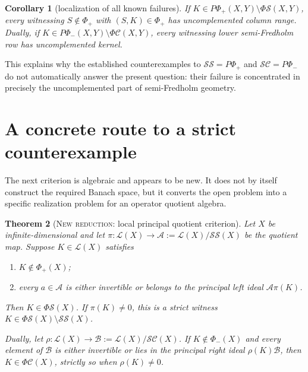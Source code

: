\documentclass[11pt]{article}
\newtheorem{theorem}{Theorem}[section]
\newtheorem{corollary}[theorem]{Corollary}
\theoremstyle{definition}
\newcommand{\Lop}{\mathcal L}
\newcommand{\SSing}{\mathcal{SS}}
\newcommand{\SCos}{\mathcal{SC}}
\newcommand{\PhiS}{\Phi\mathcal S}
\newcommand{\PhiC}{\Phi\mathcal C}
\newcommand{\PhiP}{\Phi_+}
\newcommand{\PhiM}{\Phi_-}
\newcommand{\PPhiP}{P\Phi_+}
\newcommand{\PPhiM}{P\Phi_-}
\newcommand{\newresult}{\textcolor{newblue}{\textsc{New reduction}}}
\begin{document}
\begin{corollary}[localization of all known failures]
If \(K\in\PPhiP(X,Y)\setminus\PhiS(X,Y)\), every witnessing
\(S\notin\PhiP\) with \((S,K)\in\PhiP\) has uncomplemented column range.  Dually, if
\(K\in\PPhiM(X,Y)\setminus\PhiC(X,Y)\), every witnessing lower semi-Fredholm row has
uncomplemented kernel.
\end{corollary}

This explains why the established counterexamples to
\(\SSing=\PPhiP\) and \(\SCos=\PPhiM\) do not automatically answer the present
question: their failure is concentrated in precisely the uncomplemented part of
semi-Fredholm geometry.

\section{A concrete route to a strict counterexample}

The next criterion is algebraic and appears to be new.  It does not by itself construct the
required Banach space, but it converts the open problem into a specific realization
problem for an operator quotient algebra.

\begin{theorem}[\newresult: local principal quotient criterion]\label{thm:local}
Let \(X\) be infinite-dimensional and let
\(\pi\colon\Lop(X)\to\mathcal A:=\Lop(X)/\SSing(X)\) be the quotient map.  Suppose
\(K\in\Lop(X)\) satisfies
\begin{enumerate}[label=\rm(\alph*)]
\item \(K\notin\PhiP(X)\);
\item every \(a\in\mathcal A\) is either invertible or belongs to the principal left ideal
\(\mathcal A\pi(K)\).
\end{enumerate}
Then \(K\in\PhiS(X)\).  If \(\pi(K)\ne0\), this is a strict witness
\(K\in\PhiS(X)\setminus\SSing(X)\).

Dually, let \(\rho\colon\Lop(X)\to\mathcal B:=\Lop(X)/\SCos(X)\).  If
\(K\notin\PhiM(X)\) and every element of \(\mathcal B\) is either invertible or lies in
the principal right ideal \(\rho(K)\mathcal B\), then
\(K\in\PhiC(X)\), strictly so when \(\rho(K)\ne0\).
\end{theorem}
\end{document}
